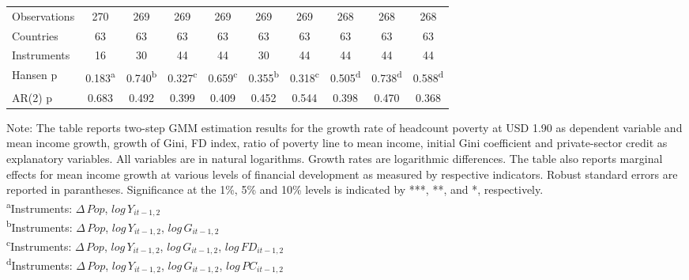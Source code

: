\documentclass[12pt, a4paper]{article}
\begin{document}
\begin{table}[htbp]
\begin{threeparttable}
{\begin{tabular}{l*{9}{c}}
				
				\hline
				Observations        &         270         &         269         &         269         &         269         &         269         &         269         &         268         &         268         &         268         \\
				Countries           &          63         &          63         &          63         &          63         &          63         &          63         &          63         &          63         &          63         \\
				Instruments         &          16         &          30         &          44         &          44         &          30         &          44         &          44         &          44         &          44         \\
				Hansen p         &       0.183\textsuperscript{a}         &       0.740\textsuperscript{b}          &       0.327\textsuperscript{c}         &       0.659\textsuperscript{c}         &       0.355\textsuperscript{b}          &       0.318\textsuperscript{c}          &       0.505\textsuperscript{d}         &       0.738\textsuperscript{d}         &       0.588\textsuperscript{d}         \\
				AR(2) p              &       0.683         &       0.492         &       0.399         &       0.409         &       0.452         &       0.544         &       0.398         &       0.470         &       0.368         \\
				\hline\hline
			\end{tabular}
		}
		\begin{tablenotes}
			\item \scriptsize{Note: The table reports two-step GMM estimation results for the growth rate of headcount poverty at USD 1.90 as dependent variable and mean income growth, growth of Gini, FD index, ratio of poverty line to mean income, initial Gini coefficient and private-sector credit as explanatory variables. All variables are in natural logarithms. Growth rates are logarithmic differences. The table also reports marginal effects for mean income growth at various levels of financial development as measured by respective indicators. Robust standard errors are reported in parantheses. Significance at the 1\%, 5\% and 10\% levels is indicated by ***, **, and *, respectively.\\
				\textsuperscript{a}Instruments: $\Delta \, Pop$, $log \, Y_{it-1,2}$}\\
			\textsuperscript{b}Instruments: $\Delta \, Pop$, $log \, Y_{it-1,2}$, $log \, G_{it-1,2}$\\
			\textsuperscript{c}Instruments: $\Delta \, Pop$, $log \, Y_{it-1,2}$, $log \, G_{it-1,2}$, $log \, FD_{it-1,2}$\\
			\textsuperscript{d}Instruments: $\Delta \, Pop$, $log \, Y_{it-1,2}$, $log \, G_{it-1,2}$, $log \, PC_{it-1,2}$\\
			

\end{tablenotes}
\end{threeparttable}
\end{table}
\end{document}

